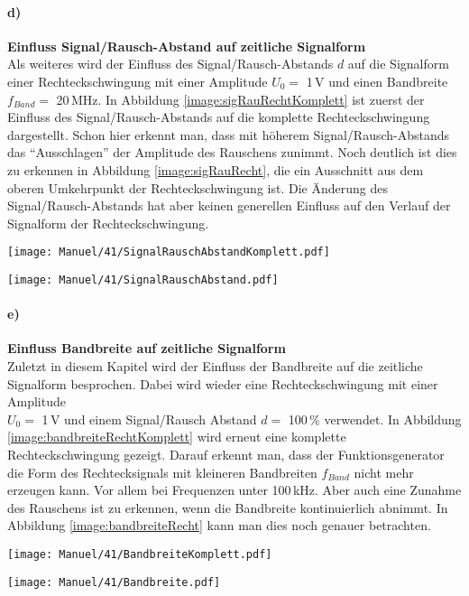 \paragraph{d)}\textbf{Einfluss Signal/Rausch-Abstand auf zeitliche Signalform}\\
Als weiteres wird der Einfluss des Signal/Rausch-Abstands $d$ auf die Signalform einer Rechteckschwingung mit einer Amplitude $U_0=$ 1\,V und einen Bandbreite\\$f_{Band}=$ 20\,MHz.
In Abbildung \ref{image:sigRauRechtKomplett} ist zuerst der Einfluss des Signal/Rausch-Abstands auf die komplette Rechteckschwingung dargestellt. Schon hier erkennt man, dass mit höherem Signal/Rausch-Abstands das \enquote{Ausschlagen} der Amplitude des Rauschens zunimmt. Noch deutlich ist dies zu erkennen in Abbildung \ref{image:sigRauRecht}, die ein Ausschnitt aus dem oberen Umkehrpunkt der Rechteckschwingung ist. Die Änderung des Signal/Rausch-Abstands hat aber keinen generellen Einfluss auf den Verlauf der Signalform der Rechteckschwingung.
\newpage
\begin{center}
    \texttt{[image: Manuel/41/SignalRauschAbstandKomplett.pdf]}
    \label{image:sigRauRechtKomplett}
\end{center}
\begin{center}
    \texttt{[image: Manuel/41/SignalRauschAbstand.pdf]}
    \label{image:sigRauRecht}
\end{center}

\paragraph{e)}\textbf{Einfluss Bandbreite auf zeitliche Signalform}\\
Zuletzt in diesem Kapitel wird der Einfluss der Bandbreite auf die zeitliche Signalform besprochen. Dabei wird wieder eine Rechteckschwingung mit einer Amplitude\\ $U_0=$ 1\,V und einem Signal/Rausch Abstand $d=$ 100\,\% verwendet. In Abbildung \ref{image:bandbreiteRechtKomplett} wird erneut eine komplette Rechteckschwingung gezeigt. Darauf erkennt man, dass der Funktionsgenerator die Form des Rechtecksignals mit kleineren Bandbreiten $f_{Band}$ nicht mehr erzeugen kann. Vor allem bei Frequenzen unter 100\,kHz. Aber auch eine Zunahme des Rauschens ist zu erkennen, wenn die Bandbreite kontinuierlich abnimmt. In Abbildung \ref{image:bandbreiteRecht} kann man dies noch genauer betrachten. 
\newpage
\begin{center}
    \texttt{[image: Manuel/41/BandbreiteKomplett.pdf]}
    \label{image:bandbreiteRechtKomplett}
\end{center}
\begin{center}
    \texttt{[image: Manuel/41/Bandbreite.pdf]}
    \label{image:bandbreiteRecht}
\end{center}